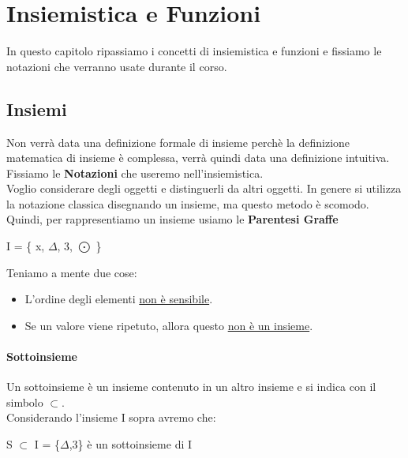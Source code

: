 \chapter*{Insiemistica e Funzioni}
    In questo capitolo ripassiamo i concetti di insiemistica e funzioni e fissiamo le notazioni che verranno usate durante il corso.
    \section*{Insiemi}
    Non verrà data una definizione formale di insieme
    perchè la definizione matematica di insieme è complessa, verrà quindi data una definizione intuitiva.
    Fissiamo le \textbf{Notazioni} che useremo nell'insiemistica.
    \\Voglio considerare degli oggetti e distinguerli da altri oggetti.
    In genere si utilizza la notazione classica disegnando un insieme, ma questo metodo è scomodo.
    Quindi, per rappresentiamo un insieme usiamo le \textbf{Parentesi Graffe}
    \begin{center}
        I = \{ x, $\Delta$, 3, $\bigodot$ \}
    \end{center}
    Teniamo a mente due cose:
    \begin{itemize}
        \item L'ordine degli elementi \underline{non è sensibile}.
        \item Se un valore viene ripetuto, allora questo \underline{non è un insieme}.
    \end{itemize}
    \subsubsection*{Sottoinsieme}
    Un sottoinsieme è un insieme contenuto in un altro insieme e si indica con il simbolo $\subset$.
    \\Considerando l'insieme I sopra avremo che:
    \begin{center}
        S $\subset$ I = \{$\Delta$,3\} è un sottoinsieme di I
    \end{center}
